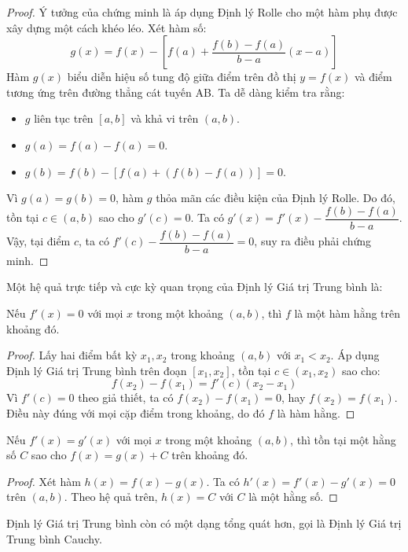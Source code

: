 \begin{proof}
Ý tưởng của chứng minh là áp dụng Định lý Rolle cho một hàm phụ được xây dựng một cách khéo léo. Xét hàm số:
$$ g(x) = f(x) - \left[ f(a) + \dfrac{f(b) - f(a)}{b - a}(x-a) \right] $$
Hàm $g(x)$ biểu diễn hiệu số tung độ giữa điểm trên đồ thị $y=f(x)$ và điểm tương ứng trên đường thẳng cát tuyến AB. Ta dễ dàng kiểm tra rằng:
\begin{itemize}
    \item $g$ liên tục trên $[a,b]$ và khả vi trên $(a,b)$.
    \item $g(a) = f(a) - f(a) = 0$.
    \item $g(b) = f(b) - [f(a) + (f(b)-f(a))] = 0$.
\end{itemize}
Vì $g(a) = g(b) = 0$, hàm $g$ thỏa mãn các điều kiện của Định lý Rolle. Do đó, tồn tại $c \in (a,b)$ sao cho $g'(c) = 0$.
Ta có $g'(x) = f'(x) - \dfrac{f(b) - f(a)}{b - a}$.
Vậy, tại điểm $c$, ta có $f'(c) - \dfrac{f(b) - f(a)}{b - a} = 0$, suy ra điều phải chứng minh.
\end{proof}

Một hệ quả trực tiếp và cực kỳ quan trọng của Định lý Giá trị Trung bình là:

\begin{corollary}\label{cor:zero-derivative}
Nếu $f'(x) = 0$ với mọi $x$ trong một khoảng $(a, b)$, thì $f$ là một hàm hằng trên khoảng đó.
\end{corollary}
\begin{proof}
Lấy hai điểm bất kỳ $x_1, x_2$ trong khoảng $(a,b)$ với $x_1 < x_2$. Áp dụng Định lý Giá trị Trung bình trên đoạn $[x_1, x_2]$, tồn tại $c \in (x_1, x_2)$ sao cho:
$$ f(x_2) - f(x_1) = f'(c)(x_2 - x_1) $$
Vì $f'(c) = 0$ theo giả thiết, ta có $f(x_2) - f(x_1) = 0$, hay $f(x_2) = f(x_1)$. Điều này đúng với mọi cặp điểm trong khoảng, do đó $f$ là hàm hằng.
\end{proof}

\begin{corollary}\label{cor:same-derivative}
Nếu $f'(x) = g'(x)$ với mọi $x$ trong một khoảng $(a, b)$, thì tồn tại một hằng số $C$ sao cho $f(x) = g(x) + C$ trên khoảng đó.
\end{corollary}
\begin{proof}
Xét hàm $h(x) = f(x) - g(x)$. Ta có $h'(x) = f'(x) - g'(x) = 0$ trên $(a,b)$. Theo hệ quả trên, $h(x) = C$ với $C$ là một hằng số.
\end{proof}

Định lý Giá trị Trung bình còn có một dạng tổng quát hơn, gọi là Định lý Giá trị Trung bình Cauchy.

